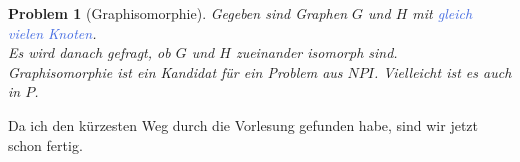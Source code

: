 \documentclass[11pt]{article}
\newcommand{\tcol}[1]{\textcolor{RoyalBlue}{#1}}
\theoremstyle{break}
\newtheorem{prob}[satz]{Problem}
\begin{document}
    \begin{prob}[Graphisomorphie]
        Gegeben sind Graphen $G$ und $H$ mit \tcol{gleich vielen Knoten}.\\
        Es wird danach gefragt, ob $G$ und $H$ zueinander isomorph sind.\\
        Graphisomorphie ist ein Kandidat für ein Problem aus $NPI$.
        Vielleicht ist es auch in $P$.
    \end{prob}

    \newpage
    \glqq Da ich den kürzesten Weg durch die Vorlesung gefunden habe, sind wir jetzt schon fertig.\grqq{}

    \printindex
\end{document}
